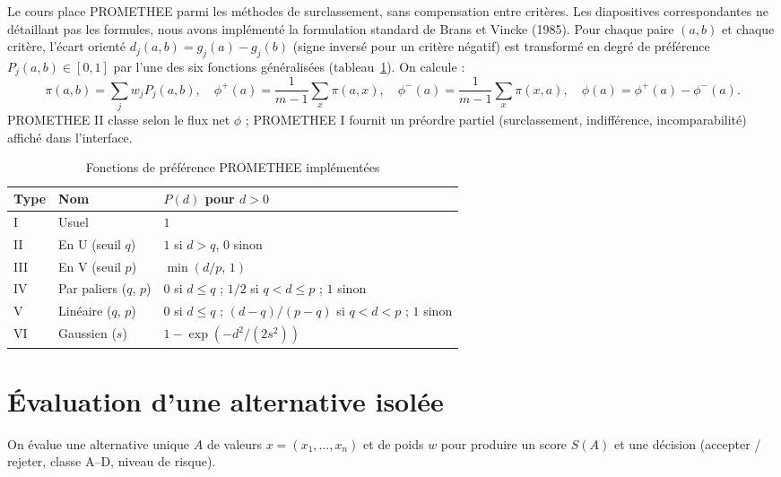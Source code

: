 \documentclass[11pt,a4paper]{report}
\theoremstyle{definition}
\theoremstyle{remark}
\begin{document}
Le cours place PROMETHEE parmi les méthodes de surclassement, sans compensation entre critères. Les
diapositives correspondantes ne détaillant pas les formules, nous avons implémenté la formulation standard
de Brans et Vincke (1985). Pour chaque paire $(a,b)$ et chaque critère, l'écart orienté
$d_j(a,b)=g_j(a)-g_j(b)$ (signe inversé pour un critère négatif) est transformé en degré de préférence
$P_j(a,b)\in[0,1]$ par l'une des six fonctions généralisées (tableau~\ref{tab:promethee}). On calcule :
\begin{equation}
  \pi(a,b)=\sum_j w_j P_j(a,b),\quad
  \phi^+(a)=\frac{1}{m-1}\sum_{x}\pi(a,x),\quad
  \phi^-(a)=\frac{1}{m-1}\sum_{x}\pi(x,a),\quad
  \phi(a)=\phi^+(a)-\phi^-(a).
\end{equation}
PROMETHEE II classe selon le flux net $\phi$ ; PROMETHEE I fournit un préordre partiel (surclassement,
indifférence, incomparabilité) affiché dans l'interface.

\begin{table}[H]
\centering
\caption{Fonctions de préférence PROMETHEE implémentées}\label{tab:promethee}
\begin{tabular}{lll}
\toprule
\textbf{Type} & \textbf{Nom} & \textbf{$P(d)$ pour $d>0$}\\
\midrule
I & Usuel & $1$\\
II & En U (seuil $q$) & $1$ si $d>q$, $0$ sinon\\
III & En V (seuil $p$) & $\min(d/p,\,1)$\\
IV & Par paliers ($q$, $p$) & $0$ si $d\le q$ ; $1/2$ si $q<d\le p$ ; $1$ sinon\\
V & Linéaire ($q$, $p$) & $0$ si $d\le q$ ; $(d-q)/(p-q)$ si $q<d<p$ ; $1$ sinon\\
VI & Gaussien ($s$) & $1-\exp\left(-d^2/(2s^2)\right)$\\
\bottomrule
\end{tabular}
\end{table}

\chapter{Évaluation d'une alternative isolée}\label{ch:single}

On évalue une alternative unique $A$ de valeurs $x=(x_1,\dots,x_n)$ et de poids $w$ pour produire un score
$S(A)$ et une décision (accepter / rejeter, classe A--D, niveau de risque).
\end{document}
